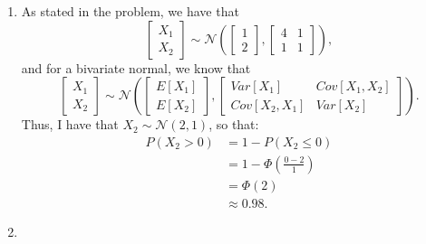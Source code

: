 \begin{problem}{15}$ $
\begin{enumerate}

\item As stated in the problem, we have that 
\begin{equation*}
\begin{bmatrix} X_1 \\ X_2 \end{bmatrix} \sim \mathcal N \left(\begin{bmatrix} 1 \\ 2 \end{bmatrix},   \left[\begin{matrix}
    4 & 1 \\
    1 & 1 
\end{matrix}\right] \right),
\end{equation*}
and for a bivariate normal, we know that 
\begin{equation*}
\begin{bmatrix} X_1 \\ X_2 \end{bmatrix} \sim \mathcal N \left(\begin{bmatrix} E[X_1] \\ E[X_2] \end{bmatrix},   \left[\begin{matrix}
    Var[X_1] & Cov[X_1, X_2] \\
    Cov[X_2, X_1] & Var[X_2] 
\end{matrix}\right] \right).
\end{equation*}
Thus, I have that $X_2 \sim \mathcal N(2, 1)$, so that:
\begin{align*}
P(X_2>0) &= 1-P(X_2\le 0)\\
&= 1-\Phi \left(\frac{0-2}{1} \right) \\
&= \Phi(2) \\
& \approx 0.98.
\end{align*}

\item 


\end{enumerate}
\end{problem}
